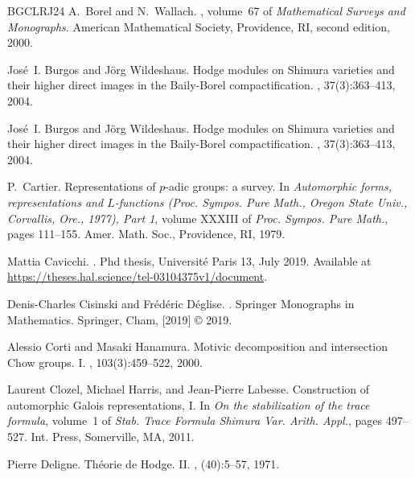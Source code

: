 \documentclass[11pt, a4paper]{amsart}
\theoremstyle{plain}
\theoremstyle{definition}
\numberwithin{equation}{section}
\begin{document}
\begin{thebibliography}{BGCLRJ24}
A.~Borel and N.~Wallach.
, volume~67 of {\em Mathematical Surveys and Monographs}.
\newblock American Mathematical Society, Providence, RI, second edition, 2000.

Jos\'{e}~I. Burgos and J\"{o}rg Wildeshaus.
\newblock Hodge modules on {S}himura varieties and their higher direct images
  in the {B}aily-{B}orel compactification.
, 37(3):363--413, 2004.

Jos\'e{}~I. Burgos and J\"org Wildeshaus.
\newblock Hodge modules on {S}himura varieties and their higher direct images
  in the {B}aily-{B}orel compactification.
, 37(3):363--413, 2004.

P.~Cartier.
\newblock Representations of {$p$}-adic groups: a survey.
\newblock In {\em Automorphic forms, representations and {$L$}-functions
  ({P}roc. {S}ympos. {P}ure {M}ath., {O}regon {S}tate {U}niv., {C}orvallis,
  {O}re., 1977), {P}art 1}, volume XXXIII of {\em Proc. Sympos. Pure Math.},
  pages 111--155. Amer. Math. Soc., Providence, RI, 1979.

Mattia Cavicchi.
.
\newblock Phd thesis, Universit\'{e} Paris 13, July 2019.
\newblock Available at
  \url{https://theses.hal.science/tel-03104375v1/document}.

Denis-Charles Cisinski and Fr\'{e}d\'{e}ric D\'{e}glise.
.
\newblock Springer Monographs in Mathematics. Springer, Cham, [2019] \copyright
  2019.

Alessio Corti and Masaki Hanamura.
\newblock Motivic decomposition and intersection {C}how groups. {I}.
, 103(3):459--522, 2000.

Laurent Clozel, Michael Harris, and Jean-Pierre Labesse.
\newblock Construction of automorphic {G}alois representations, {I}.
\newblock In {\em On the stabilization of the trace formula}, volume~1 of {\em
  Stab. Trace Formula Shimura Var. Arith. Appl.}, pages 497--527. Int. Press,
  Somerville, MA, 2011.

Pierre Deligne.
\newblock Th\'eorie de {H}odge. {II}.
, (40):5--57, 1971.


\end{thebibliography}
\end{document}
